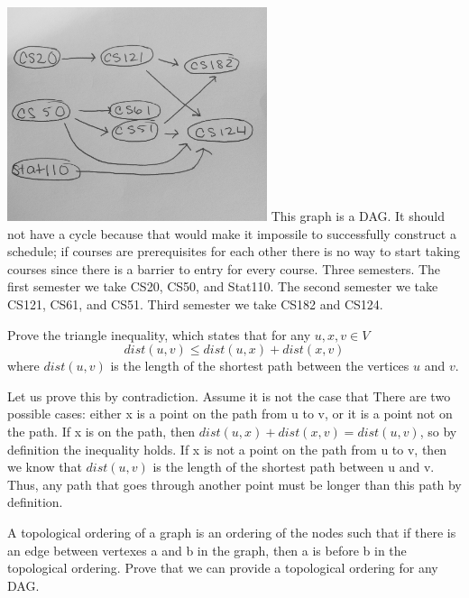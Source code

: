 \documentclass[solution, letterpaper]{cs20inclass}
\begin{document}
\begin{solution}
\subsolution \includegraphics[width=3in]{ClassGraph.jpg}
\subsolution This graph is a DAG. It should not have a cycle because that would make it impossile to successfully construct a schedule; if courses are prerequisites for each other there is no way to start taking courses since there is a barrier to entry for every course. 
\subsolution Three semesters. The first semester we take CS20, CS50, and Stat110. The second semester we take CS121, CS61, and CS51. Third semester we take CS182 and CS124. 


\end{solution}

\problem Prove the triangle inequality, which states that for any $u, x, v \in V$
\[dist(u, v) \le dist(u, x) + dist(x, v)\]
where $dist(u,v)$ is the length of the shortest path between the vertices $u$ and $v$.

\begin{solution}
Let us prove this by contradiction. Assume it is not the case that There are two possible cases: either x is a point on the path from u to v, or it is a point not on the path. If x is on the path, then $dist(u,x) + dist(x,v) = dist(u,v)$, so by definition the inequality holds. If x is not a point on the path from u to v, then we know that $dist(u,v)$ is the length of the shortest path between u and v. Thus, any path that goes through another point must be longer than this path by definition. 
\end{solution}

\problem [BONUS] A topological ordering of a graph is an ordering of the nodes such that if there is an edge between vertexes a and b in the graph, then a is before b in the topological ordering. Prove that we can provide a topological ordering for any DAG. 
\end{document}

